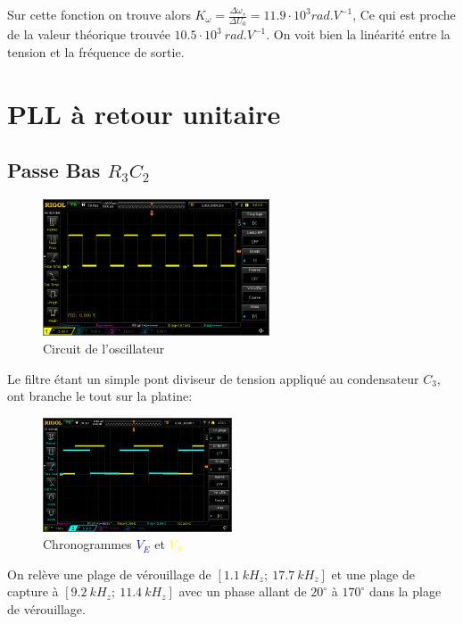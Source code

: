 \documentclass[11pt, openright]{book}
\newcommand{\tc}[2]{\textcolor{#1}{#2}}
\begin{document}
Sur cette fonction on trouve alors $K_\omega=\frac{\Delta \omega_s}{\Delta U_0}=11.9\cdot10^3 rad.V^{-1}$, Ce qui est proche de la valeur théorique trouvée $10.5\cdot10^3\ rad.V^{-1}$. On voit bien la linéarité entre la tension et la fréquence de sortie.

\newpage

\section{PLL à retour unitaire}
\subsection{Passe Bas $R_3C_2$}

\begin{figure}[ht]
    \centering
    \includegraphics[width=0.6\textwidth]{./object/g1.png}
    \caption{Circuit de l'oscillateur}
\end{figure}

Le filtre étant un simple pont diviseur de tension appliqué au condensateur $C_3$, ont branche le tout sur la platine:

\begin{figure}[ht]
    \centering
    \includegraphics[width=0.5\textwidth]{./object/g2.png}
    \caption{Chronogrammes \tc{blue}{$V_E$} et \tc{yellow}{$V_S$}}
\end{figure}

On relève une plage de vérouillage de $[1.1\ kH_z;\ 17.7\ kH_z]$ et une plage de capture à $[9.2\ kH_z;\ 11.4\ kH_z]$ avec un phase allant de $20^{\circ}$ à $170^{\circ}$ dans la plage de vérouillage.
\end{document}
